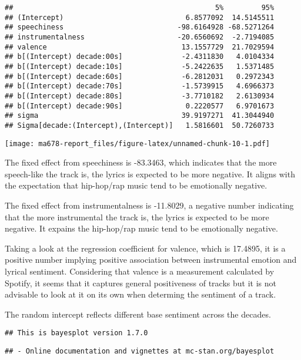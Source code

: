 \documentclass[]{article}
\begin{document}
\begin{verbatim}
##                                                5%         95%
## (Intercept)                             6.8577092  14.5145511
## speechiness                           -98.6164928 -68.5271264
## instrumentalness                      -20.6560692  -2.7194085
## valence                                13.1557729  21.7029594
## b[(Intercept) decade:00s]              -2.4311830   4.0104334
## b[(Intercept) decade:10s]              -5.2422635   1.5371485
## b[(Intercept) decade:60s]              -6.2812031   0.2972343
## b[(Intercept) decade:70s]              -1.5739915   4.6966373
## b[(Intercept) decade:80s]              -3.7710182   2.6130934
## b[(Intercept) decade:90s]               0.2220577   6.9701673
## sigma                                  39.9197271  41.3044940
## Sigma[decade:(Intercept),(Intercept)]   1.5816601  50.7260733
\end{verbatim}

\texttt{[image: ma678-report\_files/figure-latex/unnamed-chunk-10-1.pdf]}

The fixed effect from speechiness is -83.3463, which indicates that the
more speech-like the track is, the lyrics is expected to be more
negative. It aligns with the expectation that hip-hop/rap music tend to
be emotionally negative.

The fixed effect from instrumentalness is -11.8029, a negative number
indicating that the more instrumental the track is, the lyrics is
expected to be more negative. It expains the hip-hop/rap music tend to
be emotionally negative.

Taking a look at the regression coefficient for valence, which is
17.4895, it is a positive number implying positive association between
instrumental emotion and lyrical sentiment. Considering that valence is
a measurement calculated by Spotify, it seems that it captures general
positiveness of tracks but it is not advisable to look at it on its own
when determing the sentiment of a track.

The random intercept reflects different base sentiment across the
decades.

\begin{verbatim}
## This is bayesplot version 1.7.0
\end{verbatim}

\begin{verbatim}
## - Online documentation and vignettes at mc-stan.org/bayesplot
\end{verbatim}
\end{document}
